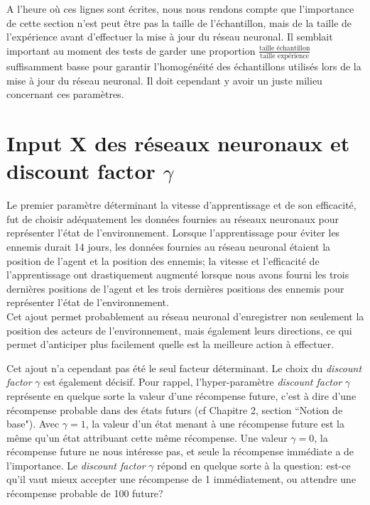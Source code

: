 \documentclass[11pt,a4paper]{report}
\begin{document}
   \par A l'heure où ces lignes sont écrites, nous nous rendons compte que l'importance de cette section n'est peut être pas la taille de l'échantillon, mais de la taille de l’expérience avant d'effectuer la mise à jour du réseau neuronal. Il semblait important au moment des tests de garder une proportion $\frac{\text{taille échantillon}}{\text{taille expérience}}$ suffisamment basse pour garantir l'homogénéité des échantillons utilisés lors de la mise à jour du réseau neuronal. Il doit cependant y avoir un juste milieu concernant ces paramètres. 
   
   \section{Input X des réseaux neuronaux et discount factor $\gamma$}
   
   \par Le premier paramètre déterminant la vitesse d'apprentissage et de son efficacité, fut de choisir adéquatement les données fournies au réseaux neuronaux pour représenter l'état de l'environnement. Lorsque l'apprentissage pour éviter les ennemis durait 14 jours, les données fournies au réseau neuronal étaient la position de l'agent et la position des ennemis; la vitesse et l’efficacité de l'apprentissage ont drastiquement augmenté lorsque nous avons fourni les trois dernières positions de l'agent et les trois dernières positions des ennemis pour représenter l'état de l'environnement. \\
   Cet ajout permet probablement au réseau neuronal d'enregistrer non seulement la position des acteurs de l'environnement, mais également leurs directions, ce qui permet d'anticiper plus facilement quelle est la meilleure action à effectuer. 
   
   \par Cet ajout n'a cependant pas été le seul facteur déterminant. Le choix du \textit{discount factor} $\gamma$ est également décisif. Pour rappel, l'hyper-paramètre \textit{discount factor} $\gamma$ représente en quelque sorte la valeur d'une récompense future, c'est à dire d'une récompense probable dans des états futurs (cf Chapitre 2, section ``Notion de base"). Avec $\gamma = 1$, la valeur d'un état menant à une récompense future est la même qu'un état attribuant cette même récompense. Une valeur $\gamma = 0$, la récompense future ne nous intéresse pas, et seule la récompense immédiate a de l'importance. Le \textit{discount factor} $\gamma$ répond en quelque sorte à la question: est-ce qu'il vaut mieux accepter une récompense de 1 immédiatement, ou attendre une récompense probable de 100 future? 
   
\end{document}
